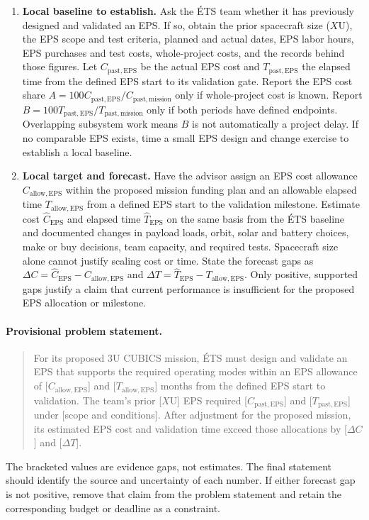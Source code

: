 \begin{enumerate}
    \item \textbf{Local baseline to establish.} Ask the ÉTS team whether it has previously designed and validated an EPS. If so, obtain the prior spacecraft size (\(X\)U), the EPS scope and test criteria, planned and actual dates, EPS labor hours, EPS purchases and test costs, whole-project costs, and the records behind those figures. Let \(C_{\mathrm{past,EPS}}\) be the actual EPS cost and \(T_{\mathrm{past,EPS}}\) the elapsed time from the defined EPS start to its validation gate. Report the EPS cost share \(A=100C_{\mathrm{past,EPS}}/C_{\mathrm{past,mission}}\) only if whole-project cost is known. Report \(B=100T_{\mathrm{past,EPS}}/T_{\mathrm{past,mission}}\) only if both periods have defined endpoints. Overlapping subsystem work means \(B\) is not automatically a project delay. If no comparable EPS exists, time a small EPS design and change exercise to establish a local baseline.

    \item \textbf{Local target and forecast.} Have the advisor assign an EPS cost allowance \(C_{\mathrm{allow,EPS}}\) within the proposed mission funding plan and an allowable elapsed time \(T_{\mathrm{allow,EPS}}\) from a defined EPS start to the validation milestone. Estimate cost \(\widehat C_{\mathrm{EPS}}\) and elapsed time \(\widehat T_{\mathrm{EPS}}\) on the same basis from the ÉTS baseline and documented changes in payload loads, orbit, solar and battery choices, make or buy decisions, team capacity, and required tests. Spacecraft size alone cannot justify scaling cost or time. State the forecast gaps as \(\Delta C=\widehat C_{\mathrm{EPS}}-C_{\mathrm{allow,EPS}}\) and \(\Delta T=\widehat T_{\mathrm{EPS}}-T_{\mathrm{allow,EPS}}\). Only positive, supported gaps justify a claim that current performance is insufficient for the proposed EPS allocation or milestone.
\end{enumerate}

\paragraph{Provisional problem statement.}
\begin{quote}
For its proposed 3U CUBICS mission, ÉTS must design and validate an EPS that supports the required operating modes within an EPS allowance of [\(C_{\mathrm{allow,EPS}}\)] and [\(T_{\mathrm{allow,EPS}}\)] months from the defined EPS start to validation. The team's prior [\(X\)U] EPS required [\(C_{\mathrm{past,EPS}}\)] and [\(T_{\mathrm{past,EPS}}\)] under [scope and conditions]. After adjustment for the proposed mission, its estimated EPS cost and validation time exceed those allocations by [\(\Delta C\)] and [\(\Delta T\)].
\end{quote}

The bracketed values are evidence gaps, not estimates. The final statement should identify the source and uncertainty of each number. If either forecast gap is not positive, remove that claim from the problem statement and retain the corresponding budget or deadline as a constraint.
